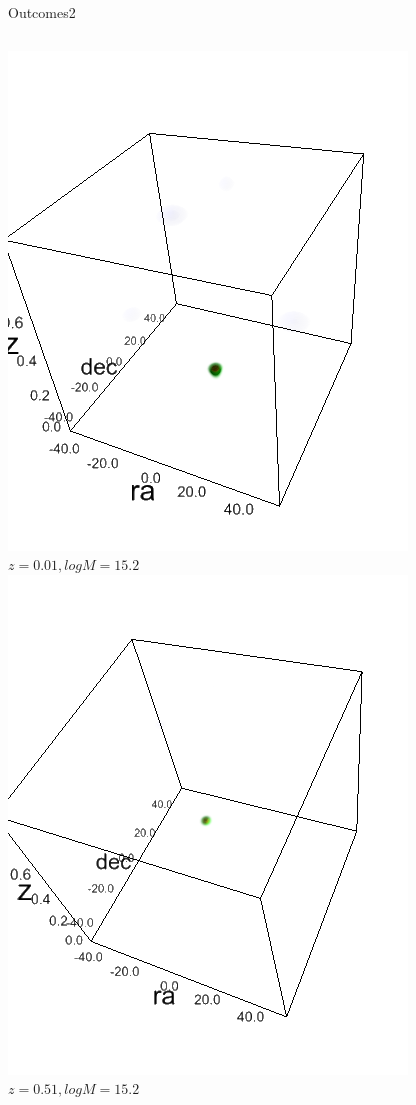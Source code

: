 \documentclass[10pt]{beamer}
\begin{document}
\begin{frame}{Outcomes2}
\begin{columns}
\begin{column}{0.32\textwidth}
\includegraphics[height=.9\textwidth]{./tau20spect-z1-m7.png}
$z=0.01, logM=15.2$
\includegraphics[height=.9\textwidth]{./tau20spect-z4-m7.png}
$z=0.51, logM=15.2$
\end{column}
\begin{column}{0.32\textwidth}

\end{column}
\end{columns}
\end{frame}
\end{document}
